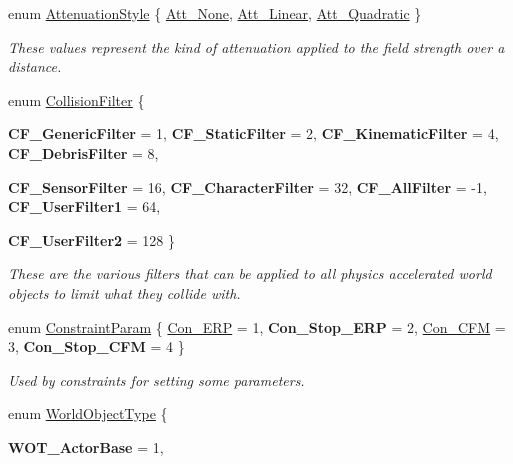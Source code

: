 \begin{DoxyCompactItemize}
enum \hyperlink{namespacephys_ad4ce7ee5c1cc164f2ea3d5f28211739f}{AttenuationStyle} \{ \hyperlink{namespacephys_ad4ce7ee5c1cc164f2ea3d5f28211739faec47e7157a10201b7aef0c1cbb6ccb5d}{Att\_\-None}, 
\hyperlink{namespacephys_ad4ce7ee5c1cc164f2ea3d5f28211739fabcceb16182220293f2260edb41b548f1}{Att\_\-Linear}, 
\hyperlink{namespacephys_ad4ce7ee5c1cc164f2ea3d5f28211739fac9ef08c39daa338975f4f8879e86100b}{Att\_\-Quadratic}
 \}
\begin{DoxyCompactList}\small\item\em These values represent the kind of attenuation applied to the field strength over a distance. \item\end{DoxyCompactList}\item 
enum \hyperlink{namespacephys_aa69523df12b54123e76c40734556ca35}{CollisionFilter} \{ \par
{\bfseries CF\_\-GenericFilter} =  1, 
{\bfseries CF\_\-StaticFilter} =  2, 
{\bfseries CF\_\-KinematicFilter} =  4, 
{\bfseries CF\_\-DebrisFilter} =  8, 
\par
{\bfseries CF\_\-SensorFilter} =  16, 
{\bfseries CF\_\-CharacterFilter} =  32, 
{\bfseries CF\_\-AllFilter} =  -\/1, 
{\bfseries CF\_\-UserFilter1} =  64, 
\par
{\bfseries CF\_\-UserFilter2} =  128
 \}
\begin{DoxyCompactList}\small\item\em These are the various filters that can be applied to all physics accelerated world objects to limit what they collide with. \item\end{DoxyCompactList}\item 
enum \hyperlink{namespacephys_aa1e7cf2d7efcaeaeac304f711e7564e8}{ConstraintParam} \{ \hyperlink{namespacephys_aa1e7cf2d7efcaeaeac304f711e7564e8a91b73a6b29e0251fecb859d93ca9475e}{Con\_\-ERP} =  1, 
{\bfseries Con\_\-Stop\_\-ERP} =  2, 
\hyperlink{namespacephys_aa1e7cf2d7efcaeaeac304f711e7564e8a787066a518df293eac194afbf6bd8da6}{Con\_\-CFM} =  3, 
{\bfseries Con\_\-Stop\_\-CFM} =  4
 \}
\begin{DoxyCompactList}\small\item\em Used by constraints for setting some parameters. \item\end{DoxyCompactList}\item 
enum \hyperlink{namespacephys_a56410935e1c614a932dbc91ee7330df1}{WorldObjectType} \{ \par
{\bfseries WOT\_\-ActorBase} =  1, 

\end{DoxyCompactItemize}
